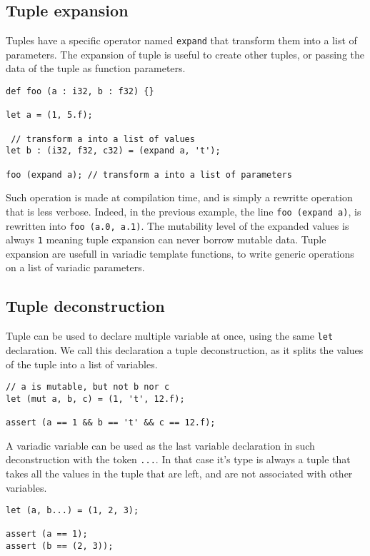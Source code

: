\subsection {Tuple expansion}

Tuples have a specific operator named \texttt{expand} that transform them into a
list of parameters. The expansion of tuple is useful to create other tuples, or
passing the data of the tuple as function parameters.

\begin{lstlisting}[style=coloredverbatim]
def foo (a : i32, b : f32) {}

let a = (1, 5.f);

 // transform a into a list of values
let b : (i32, f32, c32) = (expand a, 't');

foo (expand a); // transform a into a list of parameters
\end{lstlisting}

Such operation is made at compilation time, and is simply a rewritte operation
that is less verbose. Indeed, in the previous example, the line \texttt{foo
  (expand a)}, is rewritten into \texttt{foo (a.0, a.1)}. The mutability level
of the expanded values is always \texttt{1} meaning tuple expansion can never
borrow mutable data. Tuple expansion are usefull in variadic template functions,
to write generic operations on a list of variadic parameters.

\subsection {Tuple deconstruction}

Tuple can be used to declare multiple variable at once, using the same
\texttt{let} declaration. We call this declaration a tuple deconstruction, as it
splits the values of the tuple into a list of variables.

\begin{lstlisting}[style=coloredverbatim]
  // a is mutable, but not b nor c
let (mut a, b, c) = (1, 't', 12.f);

assert (a == 1 && b == 't' && c == 12.f);
\end{lstlisting}

A variadic variable can be used as the last variable declaration in such
deconstruction with the token \texttt{...}. In that case it's type is always a
tuple that takes all the values in the tuple that are left, and are not
associated with other variables.

\begin{lstlisting}[style=coloredverbatim]
let (a, b...) = (1, 2, 3);

assert (a == 1);
assert (b == (2, 3));
\end{lstlisting}


